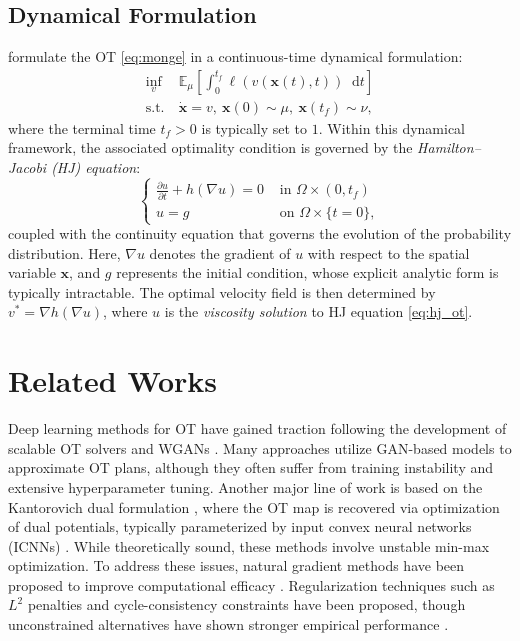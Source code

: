 \documentclass{article} %
\theoremstyle{plain}
\theoremstyle{definition}
\theoremstyle{remark}
\newcommand{\bE}{\mathbb{E}}
\newcommand{\bx}{\mathbf{x}}
\newcommand*\diff{\mathop{}\!\mathrm{d}}
\begin{document}
\subsection{Dynamical Formulation}\vspace{-0.3em}
\cite{benamou2000computational} formulate the OT \eqref{eq:monge} in a continuous-time dynamical formulation:
\begin{align}\label{eq:dynamical_programming}
\underset{v}{\inf} &\  \bE_\mu\left[\int_0^{t_f}
\ell\left( v\left(\bx(t),t\right)\right)\diff t \right]\\
\text{s.t.} &\  \dot{\bx} =v \label{eq:ot_x_flow}, \  \bx(0)\sim\mu,\ \bx(t_f)\sim\nu,
\end{align}
where the terminal time $t_f>0$ is typically set to $1$. Within this dynamical framework, the associated optimality condition is governed by the \textit{Hamilton--Jacobi (HJ) equation}: 
\begin{equation}\label{eq:hj_ot}
    \begin{cases}
    \frac{\partial u}{\partial t}+h\left(\nabla u\right)=0 & \text{ in } \Omega\times (0,t_f)\\
    u=g & \text{ on }\Omega\times\{t=0\},
    \end{cases}
\end{equation}
coupled with the continuity equation that governs the evolution of the probability distribution.
Here, $\nabla u$ denotes the gradient of $u$ with respect to the spatial variable $\bx$, and $g$ represents the initial condition, whose explicit analytic form is typically intractable. The optimal velocity field is then determined by $v^*=\nabla h\left(\nabla u\right)$, where $u$ is the \textit{viscosity solution} to HJ equation \eqref{eq:hj_ot}.

\section{Related Works}\vspace{-0.2em}
Deep learning methods for OT have gained traction following the development of scalable OT solvers \citep{genevay2016stochastic, seguy2017large} and WGANs \citep{arjovsky2017wasserstein}. Many approaches utilize GAN-based models to approximate OT plans, although they often suffer from training instability and extensive hyperparameter tuning.
Another major line of work is based on the Kantorovich dual formulation \citep{kantorovich2006translocation}, where the OT map is recovered via optimization of dual potentials, typically parameterized by input convex neural networks (ICNNs) \citep{amos2017input}. While theoretically sound, these methods involve unstable min-max optimization. To address these issues, natural gradient methods have been proposed to improve computational efficacy \citep{shen2020sinkhorn, liu2024natural}. Regularization techniques such as $L^2$ penalties \citep{genevay2016stochastic, sanjabi2018convergence} and cycle-consistency constraints \citep{korotin2019wasserstein, korotin2021continuous} have been proposed, though unconstrained alternatives have shown stronger empirical performance \citep{korotin2021neural, fan2021variational}.
\end{document}
